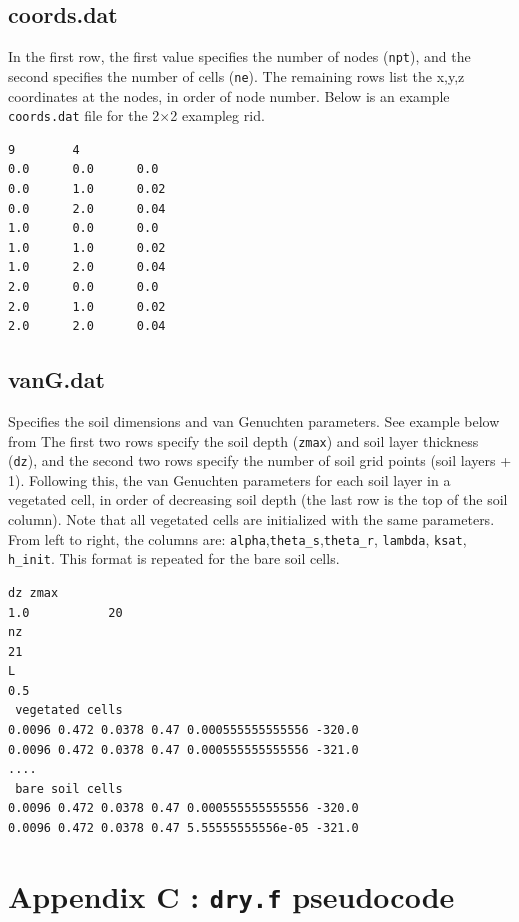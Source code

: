 \documentclass{article}
\newcommand{\code}[1]{\texttt{#1}}
\begin{document}
\subsection{coords.dat}

In the first row, the first value specifies the number of nodes (\code{npt}), and the second specifies the number of cells (\code{ne}).  The remaining rows list the x,y,z coordinates at the nodes, in order of node number. Below is an example \code{coords.dat} file for the 2$\times$2 exampleg rid.


\begin{verbatim}
9        4            
0.0      0.0      0.0       
0.0      1.0      0.02
0.0      2.0      0.04
1.0      0.0      0.0       
1.0      1.0      0.02
1.0      2.0      0.04
2.0      0.0      0.0       
2.0      1.0      0.02
2.0      2.0      0.04
\end{verbatim}

\subsection{vanG.dat}

Specifies the soil dimensions and van Genuchten parameters.  See example below from 
The first two rows specify the soil depth (\code{zmax}) and soil layer thickness (\code{dz}), and the second two rows specify the number of soil grid points (soil layers + 1).  
Following this, the van Genuchten parameters for each soil layer in a vegetated cell, in order of decreasing soil depth (the last row is the top of the soil column). Note that all vegetated cells are initialized with the same parameters.
From left to right, the columns are: 
	\code{alpha},\code{theta\_s},\code{theta\_r}, \code{lambda}, \code{ksat}, \code{h\_init}.  This format is repeated for the bare soil cells.  
	
\begin{verbatim}
dz zmax 
1.0           20             
nz 
21             
L 
0.5            
 vegetated cells  
0.0096 0.472 0.0378 0.47 0.000555555555556 -320.0 
0.0096 0.472 0.0378 0.47 0.000555555555556 -321.0
....
 bare soil cells 
0.0096 0.472 0.0378 0.47 0.000555555555556 -320.0 
0.0096 0.472 0.0378 0.47 5.55555555556e-05 -321.0 
\end{verbatim}


\section*{Appendix C : \code{dry.f} pseudocode}
\end{document}
